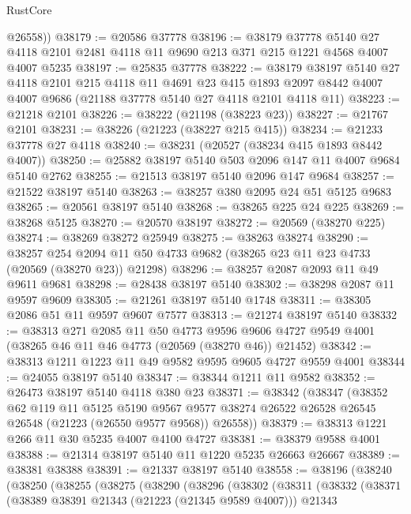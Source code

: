\begin{lexlean}{RustCore}
\begin{coremodule}
        @26558))
@38179 := @20586 @37778
@38196 := @38179
    @37778
    @5140
    @27
    @4118
    @2101
    @2481
    @4118
    @11
    @9690
    @213
    @371
    @215
    @1221
    @4568
    @4007
    @4007
    @5235
@38197 := @25835 @37778
@38222 := @38179
    @38197
    @5140
    @27
    @4118
    @2101
    @215
    @4118
    @11
    @4691
    @23
    @415
    @1893
    @2097
    @8442
    @4007
    @4007
    @9686
    (@21188 @37778 @5140 @27 @4118 @2101 @4118 @11)
@38223 := @21218 @2101
@38226 := @38222 (@21198 (@38223 @23))
@38227 := @21767 @2101
@38231 := @38226 (@21223 (@38227 @215 @415))
@38234 := @21233 @37778 @27 @4118
@38240 := @38231 (@20527 (@38234 @415 @1893 @8442 @4007))
@38250 := @25882 @38197 @5140 @503 @2096 @147 @11 @4007 @9684 @5140 @2762
@38255 := @21513 @38197 @5140 @2096 @147 @9684
@38257 := @21522 @38197 @5140
@38263 := @38257 @380 @2095 @24 @51 @5125 @9683
@38265 := @20561 @38197 @5140
@38268 := @38265 @225 @24 @225
@38269 := @38268 @5125
@38270 := @20570 @38197
@38272 := @20569 (@38270 @225)
@38274 := @38269 @38272 @25949
@38275 := @38263 @38274
@38290 := @38257
    @254
    @2094
    @11
    @50
    @4733
    @9682
    (@38265 @23 @11 @23 @4733 (@20569 (@38270 @23)) @21298)
@38296 := @38257 @2087 @2093 @11 @49 @9611 @9681
@38298 := @28438 @38197 @5140
@38302 := @38298 @2087 @11 @9597 @9609
@38305 := @21261 @38197 @5140 @1748
@38311 := @38305 @2086 @51 @11 @9597 @9607 @7577
@38313 := @21274 @38197 @5140
@38332 := @38313
    @271
    @2085
    @11
    @50
    @4773
    @9596
    @9606
    @4727
    @9549
    @4001
    (@38265 @46 @11 @46 @4773 (@20569 (@38270 @46)) @21452)
@38342 := @38313 @1211 @1223 @11 @49 @9582 @9595 @9605 @4727 @9559 @4001
@38344 := @24055 @38197 @5140
@38347 := @38344 @1211 @11 @9582
@38352 := @26473 @38197 @5140 @4118 @380 @23
@38371 := @38342
    (@38347
      (@38352
        @62
        @119
        @11
        @5125
        @5190
        @9567
        @9577
        @38274
        @26522
        @26528
        @26545
        @26548
        (@21223 (@26550 @9577 @9568))
        @26558))
@38379 := @38313 @1221 @266 @11 @30 @5235 @4007 @4100 @4727
@38381 := @38379 @9588 @4001
@38388 := @21314 @38197 @5140 @11 @1220 @5235 @26663 @26667
@38389 := @38381 @38388
@38391 := @21337 @38197 @5140
@38558 := @38196
    (@38240
      (@38250
        (@38255
          (@38275
            (@38290
              (@38296
                (@38302
                  (@38311
                    (@38332
                      (@38371
                        (@38389 @38391 @21343 (@21223 (@21345 @9589 @4007)))
                        @21343

\end{coremodule}
\end{lexlean}
